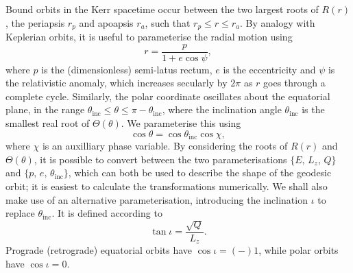 Bound orbits in the Kerr spacetime occur between the two largest roots of $R(r)$, the periapsis $r_p$ and apoapsis $r_a$, such that $r_p \leq r \leq r_a$. By analogy with Keplerian orbits, it is useful to parameterise the radial motion using
\begin{equation}
r = \frac{p}{1+e \cos\psi},
\end{equation}
where $p$ is the (dimensionless) semi-latus rectum, $e$ is the eccentricity and $\psi$ is the relativistic anomaly, which increases secularly by $2\pi$ as $r$ goes through a complete cycle. Similarly, the polar coordinate oscillates about the equatorial plane, in the range $\theta_\mathrm{inc} \leq \theta \leq \pi - \theta_\mathrm{inc}$, where the inclination angle $\theta_\mathrm{inc}$ is the smallest real root of $\Theta(\theta)$. We parameterise this using
\begin{equation}
\cos\theta = \cos\theta_\mathrm{inc} \cos\chi,
\end{equation}
where $\chi$ is an auxilliary phase variable. By considering the roots of $R(r)$ and $\Theta(\theta)$, it is possible to convert between the two parameterisations $\{E,\,L_z,\,Q\}$ and $\{p,\,e,\,\theta_\mathrm{inc}\}$, which can both be used to describe the shape of the geodesic orbit; it is easiest to calculate the transformations numerically. We shall also make use of an alternative parameterisation, introducing the inclination $\iota$ to replace $\theta_\mathrm{inc}$. It is defined according to
\begin{equation}
\tan \iota = \frac{\sqrt{Q}}{L_z}.
\end{equation}
Prograde (retrograde) equatorial orbits have $\cos\iota = (-)1$, while polar orbits have $\cos\iota = 0$.


